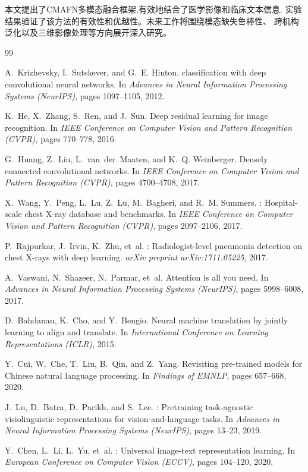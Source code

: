 \documentclass[12pt,a4paper]{article}
\theoremstyle{definition}
\begin{document}
本文提出了CMAFN多模态融合框架,有效地结合了医学影像和临床文本信息.
实验结果验证了该方法的有效性和优越性。未来工作将围绕模态缺失鲁棒性、
跨机构泛化以及三维影像处理等方向展开深入研究。


\begin{thebibliography}{99}

A.~Krizhevsky, I.~Sutskever, and G.~E. Hinton.
 classification with deep convolutional neural networks.
\newblock In \textit{Advances in Neural Information Processing Systems
  (NeurIPS)}, pages 1097--1105, 2012.

K.~He, X.~Zhang, S.~Ren, and J.~Sun.
\newblock Deep residual learning for image recognition.
\newblock In \textit{IEEE Conference on Computer Vision and Pattern Recognition
  (CVPR)}, pages 770--778, 2016.

G.~Huang, Z.~Liu, L.~van~der~Maaten, and K.~Q. Weinberger.
\newblock Densely connected convolutional networks.
\newblock In \textit{IEEE Conference on Computer Vision and Pattern Recognition
  (CVPR)}, pages 4700--4708, 2017.

X.~Wang, Y.~Peng, L.~Lu, Z.~Lu, M.~Bagheri, and R.~M. Summers.
: Hospital-scale chest X-ray database and benchmarks.
\newblock In \textit{IEEE Conference on Computer Vision and Pattern Recognition
  (CVPR)}, pages 2097--2106, 2017.

P.~Rajpurkar, J.~Irvin, K.~Zhu, et~al.
: Radiologist-level pneumonia detection on chest X-rays with
  deep learning.
\newblock \textit{arXiv preprint arXiv:1711.05225}, 2017.

A.~Vaswani, N.~Shazeer, N.~Parmar, et~al.
\newblock Attention is all you need.
\newblock In \textit{Advances in Neural Information Processing Systems
  (NeurIPS)}, pages 5998--6008, 2017.

D.~Bahdanau, K.~Cho, and Y.~Bengio.
\newblock Neural machine translation by jointly learning to align and translate.
\newblock In \textit{International Conference on Learning Representations
  (ICLR)}, 2015.

Y.~Cui, W.~Che, T.~Liu, B.~Qin, and Z.~Yang.
\newblock Revisiting pre-trained models for {Chinese} natural language
  processing.
\newblock In \textit{Findings of EMNLP}, pages 657--668, 2020.

J.~Lu, D.~Batra, D.~Parikh, and S.~Lee.
: Pretraining task-agnostic visiolinguistic representations
  for vision-and-language tasks.
\newblock In \textit{Advances in Neural Information Processing Systems
  (NeurIPS)}, pages 13--23, 2019.

Y.~Chen, L.~Li, L.~Yu, et~al.
: Universal image-text representation learning.
\newblock In \textit{European Conference on Computer Vision (ECCV)},
  pages 104--120, 2020.

\end{thebibliography}
\end{document}
